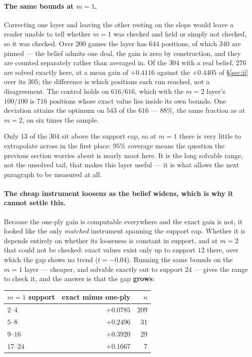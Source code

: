 \documentclass[11pt,a4paper]{article}
\begin{document}
\paragraph{The same bounds at $m = 1$.} Correcting one layer and leaving the
other resting on the slope would leave a reader unable to tell whether $m = 1$
was checked and held or simply not checked, so it was checked. Over $200$
games the layer has $644$ positions, of which $340$ are pinned --- the belief
admits one deal, the gain is zero by construction, and they are counted
separately rather than averaged in. Of the $304$ with a real belief, $276$ are
solved exactly here, at a mean gain of $+0.4116$ against the $+0.4405$ of
\S\ref{sec:ii} over its $305$; the difference is which positions each run
reached, not a disagreement. The control holds on \textbf{$616/616$}, which
with the $m = 2$ layer's $100/100$ is $716$ positions whose exact value lies
inside its own bounds. One deviation attains the optimum on $543$ of the $616$
--- $88\%$, the same fraction as at $m = 2$, on six times the sample.

Only $13$ of the $304$ sit above the support cap, so at $m = 1$ there is very
little to extrapolate across in the first place: $95\%$ coverage means the
question the previous section worries about is nearly moot here. It is the
long solvable range, not the unsolved tail, that makes this layer useful --- it
is what allows the next paragraph to be measured at all.

\paragraph{The cheap instrument loosens as the belief widens, which is why it
cannot settle this.} Because the one-ply gain is computable everywhere and the
exact gain is not, it looked like the only \emph{matched} instrument spanning
the support cap. Whether it is depends entirely on whether its looseness is
constant in support, and at $m = 2$ that could not be checked: exact values
exist only up to support $12$ there, over which the gap shows no trend
($t = -0.04$). Running the same bounds on the $m = 1$ layer --- cheaper, and
solvable exactly out to support $24$ --- gives the range to check it, and the
answer is that the gap \textbf{grows}:

\begin{center}
\begin{tabular}{lrr}
\toprule
$m = 1$ support & exact minus one-ply & $n$ \\
\midrule
$2$--$4$   & $+0.0785$ & $209$ \\
$5$--$8$   & $+0.2496$ & $31$ \\
$9$--$16$  & $+0.3920$ & $29$ \\
$17$--$24$ & $+0.1667$ & $7$ \\
\bottomrule
\end{tabular}
\end{center}
\end{document}

